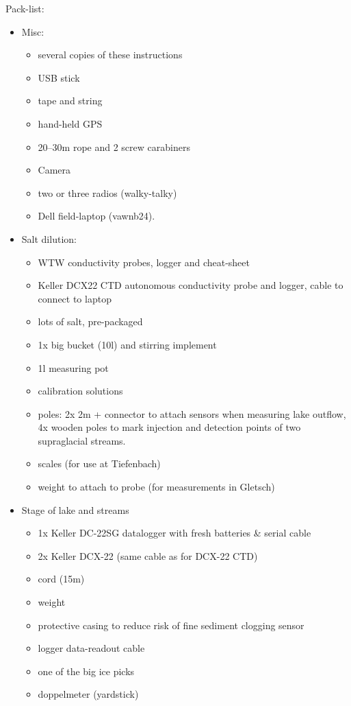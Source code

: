 \documentclass[DIV=15,halfparskip,11pt,headinclude]{scrartcl}
\begin{document}
Pack-list:\\
\begin{itemize}
\item Misc:
  \begin{itemize}
  \item several copies of these instructions
  \item USB stick
  \item tape and string
  \item hand-held GPS
  \item 20--30m rope and 2 screw carabiners
  \item Camera
  \item two or three radios (walky-talky)
  \item Dell field-laptop (vawnb24).
  \end{itemize}
\item Salt dilution:
  \begin{itemize}
  \item WTW conductivity probes, logger and cheat-sheet
  \item Keller DCX22 CTD autonomous conductivity probe and logger,
    cable to connect to laptop
  \item lots of salt, pre-packaged
  \item 1x big bucket (10l) and stirring implement
  \item 1l measuring pot
  \item calibration solutions
  \item poles: 2x 2m + connector to attach sensors when measuring
    lake outflow, 4x wooden poles to mark injection and
    detection points of two supraglacial streams.
  \item scales (for use at Tiefenbach)
  \item weight to attach to probe (for measurements in Gletsch)
  \end{itemize}
\item Stage of lake and streams
  \begin{itemize}
  \item 1x Keller DC-22SG datalogger with fresh batteries \& serial cable
  \item 2x Keller DCX-22 (same cable as for DCX-22 CTD)
  \item cord (15m)
  \item weight
  \item protective casing to reduce risk of fine sediment clogging sensor
  \item logger data-readout cable
  \item one of the big ice picks
  \item doppelmeter (yardstick)
  \end{itemize}
\end{itemize}
\end{document}
